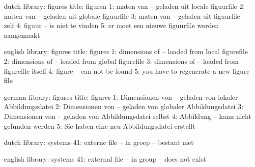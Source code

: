 

\unprotect

\startmessages  dutch  library: figures
   title: figuren
      1: maten van -- geladen uit locale figuurfile
      2: maten van -- geladen uit globale figuurfile
      3: maten van -- geladen uit figuurfile zelf 
      4: figuur -- is niet te vinden
      5: er moet een nieuwe figuurfile worden aangemaakt
\stopmessages

\startmessages  english  library: figures
   title: figures
      1: dimensions of -- loaded from local figurefile
      2: dimensions of -- loaded from global figurefile
      3: dimensions of -- loaded from figurefile itself
      4: figure -- can not be found 
      5: you have to regenerate a new figure file 
\stopmessages

\startmessages  german  library: figures
   title: figures
      1: Dimensionen von -- geladen von lokaler Abbildungsdatei
      2: Dimensionen von -- geladen von globaler Abbildungsdatei
      3: Dimensionen von -- geladen von Abbildungsdatei selbst
      4: Abbildung -- kann nicht gefunden werden
      5: Sie haben eine neu Abbildungsdatei erstellt 
\stopmessages

\startmessages  dutch  library: systems
     41: externe file -- in groep -- bestaat niet
\stopmessages

\startmessages  english  library: systems
     41: external file -- in group -- does not exist 
\stopmessages


